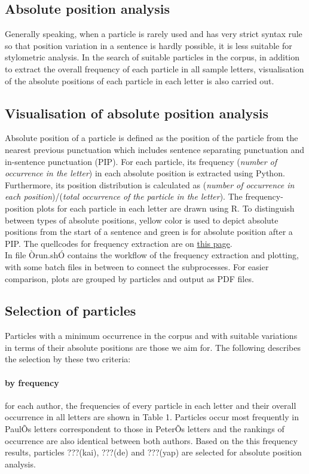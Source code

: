 \documentclass[a4paper]{article}
\begin{document}
\subsection{Absolute position analysis}
Generally speaking, when a particle is rarely used and has very strict syntax rule so that position variation in a sentence is hardly possible, it is less suitable for stylometric analysis. In the search of suitable particles in the corpus, in addition to extract the overall frequency of each particle in all sample letters, visualisation of the absolute positions of each particle in each letter is also carried out.  

\subsection{Visualisation of absolute position analysis}
Absolute position of a particle is defined as the position of the particle from the nearest previous punctuation which includes sentence separating punctuation and in-sentence punctuation (PIP). For each particle, its frequency (\textit{number of occurrence in the letter}) in each absolute position is extracted using Python. Furthermore, its position distribution is calculated as (\textit{number of occurrence in each position})/(\textit{total occurrence of the particle in the letter}). The frequency-position plots for each particle in each letter are drawn using R. To distinguish between types of absolute positions, yellow color is used to depict absolute positions from the start of a sentence and green is for absolute position after a PIP. The quellcodes for frequency extraction are on \href{https://github.com/KLINGTdotNET/dh-project-ws14/tree/master/src/absolute_freq}{this page}. \\

\noindent In file Òrun.shÓ contains the workflow of the frequency extraction and plotting, with some batch files in between to connect the subprocesses. For easier comparison, plots are grouped by particles and output as PDF files. 

\subsection{Selection of particles}
Particles with a minimum occurrence in the corpus and with suitable variations in terms of their absolute positions are those we aim for. The following describes the selection by these two criteria:

\paragraph{by frequency} 
for each author, the frequencies of every particle in each letter and their overall occurrence in all letters are shown in Table 1. Particles occur most frequently in PaulÕs letters correspondent to those in PeterÕs letters and the rankings of occurrence are also identical between both authors. Based on the this frequency results,  particles ???(kai), ???(de) and ???(yap) are selected for absolute position analysis. \\
\end{document}
